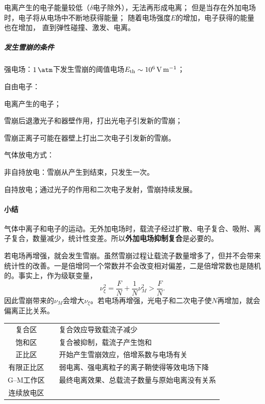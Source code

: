电离产生的电子能量较低（$\delta$电子除外），无法再形成电离；
但是当存在外加电场时，电子将从电场中不断地获得能量；
随着电场强度$E$的增加，电子获得的能量也在增加，%
直到弹性碰撞、激发、电离。
\subparagraph{发生雪崩的条件}
\begin{compactenum}
	\item 强电场：$\qty{1}{\atm}$下发生雪崩的阈值电场$E_{\mathrm{th}} \sim \qty{e6}{\volt\per\metre}$；
	\item 自由电子：
	\begin{compactenum}
		\item 电离产生的电子；
		\item 雪崩后退激光子和器壁作用，打出光电子引发新的雪崩；
		\item 雪崩正离子可能在器壁上打出二次电子引发新的雪崩。
	\end{compactenum}
\end{compactenum}
气体放电方式：
\begin{compactitem}
	\item 非自持放电：雪崩从产生到结束，只发生一次。
	\item 自持放电；通过光子的作用和二次电子发射，雪崩持续发展。
\end{compactitem}
\paragraph{小结}气体中离子和电子的运动。无外加电场时，载流子经过扩散、电子复合、吸附、离子复合，数量减少，统计性变差。所以\textbf{外加电场抑制复合}是必要的。

若电场再增强，就会发生雪崩。虽然雪崩过程让载流子数量增多了，但并不会带来统计性的改善。一是倍增同一个常数并不会改变相对偏差，二是倍增常数也是随机的。事实上，作为级联变量，
\begin{equation}\label{eq:nrd-avalanche-excess-variance}
	\nu_\xi^2 = \frac FN + \frac1N\nu_M^2 > \frac FN.
\end{equation}
因此雪崩带来的$\nu_M$会增大$\nu_\xi$。若电场再增强，光电子和二次电子使$N$再增加，就会偏离正比关系。

\begin{notecaptionblock}
	\begin{tabular}{ccl}
		\toprule
		复合区&&复合效应导致载流子减少\\
		饱和区&\checkmark&复合被抑制，载流子产生饱和\\
		正比区&\checkmark&开始产生雪崩效应，倍增系数与电场有关\\
		有限正比区&&弱电离、强电离粒子的离子鞘使得等效电场下降\\
		G--M工作区&\checkmark&最终电离效果、总载流子数量与原始电离没有关系\\
		连续放电区\\
		\bottomrule
	\end{tabular}
\end{notecaptionblock}


